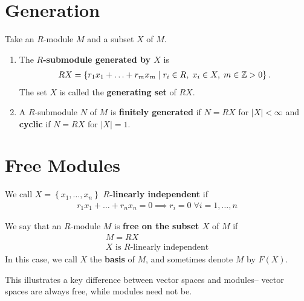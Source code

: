 \documentclass{memoir}
\begin{document}
\section{Generation}
\label{sec:generation}

\begin{defn}
	Take an \(R\)-module \(M\) and a subset \(X\) of \(M\).
	\begin{enumerate}
		\item The \textbf{\(R\)-submodule generated by \(X\)} is
			\begin{align*}
				RX = \left\{r_1x_1+\ldots+r_mx_m \mid r_i \in R, \; x_i \in X, \; m \in \mathbb{Z}>0 \right\} .
			\end{align*}
			The set \(X\) is called the \textbf{generating set} of \(RX\).
		\item A \(R\)-submodule \(N\) of \(M\) is \textbf{finitely generated} if \(N = RX\) for \(\left| X \right| <\infty\) and \textbf{cyclic} if \(N=RX\) for \(\left| X \right| =1\).
	\end{enumerate}
\end{defn}

\section{Free Modules}
\label{sec:free_modules}

\begin{defn}
	We call \(X = \left\{x_1,\ldots,x_n \right\} \) \textbf{\(R\)-linearly independent} if
	\begin{align*}
		r_1x_1+\ldots+r_nx_n = 0 \implies r_i = 0 \; \forall i = 1,\ldots,n
	\end{align*}
\end{defn}

\begin{defn}
	We say that an \(R\)-module \(M\) is \textbf{free on the subset \(X\)} of \(M\) if
	\begin{align*}
		M = RX\\
		X \text{ is \(R\)-linearly independent}
	\end{align*}
In this case, we call \(X\) the \textbf{basis} of \(M\), and sometimes denote \(M\) by \(F(X)\).
\end{defn}
This illustrates a key difference between vector spaces and modules-- vector spaces are always free, while modules need not be.
\end{document}
